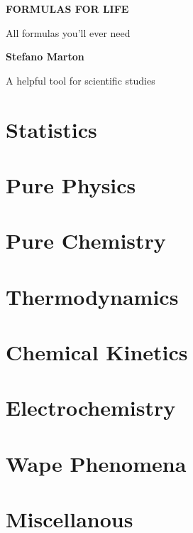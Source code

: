 \documentclass[a4,11pt]{report}
\makeatletter
\renewcommand\tableofcontents{%
	\begin{multicols}{2}[\section*{\contentsname
			  \@mkboth{%
				  \MakeUppercase\contentsname}{\MakeUppercase\contentsname}}]%
		\@starttoc{toc}%
	\end{multicols}%
}
\makeatother
\begin{document}
\begin{titlepage}
	\begin{center}
		\vspace*{6cm}

		\Huge
		\textbf{FORMULAS FOR LIFE}

		\vspace{0.5cm}
		\LARGE
		All formulas you'll ever need

		\vspace{1.5cm}

		\textbf{Stefano Marton}

		\vfill

		A helpful tool for scientific studies

		\vspace{0.8cm}

	\end{center}
\end{titlepage}

\tableofcontents

\chapter{Statistics}


\chapter{Pure Physics}


\chapter{Pure Chemistry}


\chapter{Thermodynamics}


\chapter{Chemical Kinetics}


\chapter{Electrochemistry}


\chapter{Wape Phenomena}


\chapter{Miscellanous}

\end{document}
